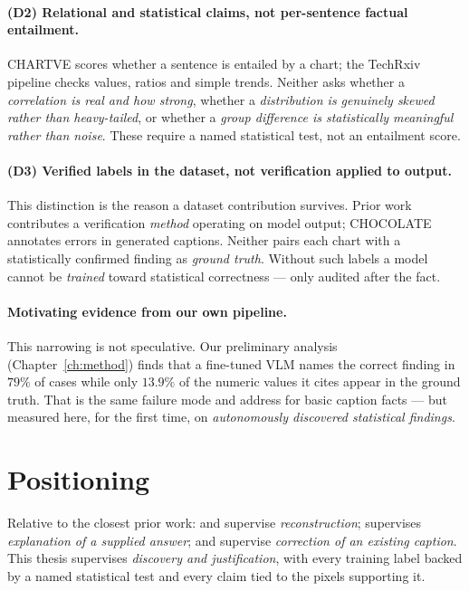 \paragraph{(D2) Relational and statistical claims, not per-sentence factual
entailment.} CHARTVE scores whether a sentence is entailed by a chart; the
TechRxiv pipeline checks values, ratios and simple trends. Neither asks whether a
\emph{correlation is real and how strong}, whether a \emph{distribution is
genuinely skewed rather than heavy-tailed}, or whether a \emph{group difference
is statistically meaningful rather than noise}. These require a named statistical
test, not an entailment score.

\paragraph{(D3) Verified labels in the dataset, not verification applied to
output.} This distinction is the reason a dataset contribution survives. Prior
work contributes a verification \emph{method} operating on model output;
CHOCOLATE annotates errors in generated captions. Neither pairs each chart with a
statistically confirmed finding as \emph{ground truth}. Without such labels a
model cannot be \emph{trained} toward statistical correctness --- only audited
after the fact.

\paragraph{Motivating evidence from our own pipeline.} This narrowing is not
speculative. Our preliminary analysis (Chapter~\ref{ch:method}) finds that a
fine-tuned VLM names the correct finding in $79\%$ of cases while only $13.9\%$
of the numeric values it cites appear in the ground truth. That is the same
failure mode \citet{chocolate} and \citet{techrxiv} address for basic caption
facts --- but measured here, for the first time, on \emph{autonomously discovered
statistical findings}.

\section{Positioning}

Relative to the closest prior work: \citet{chartgen} and \citet{chartcoder}
supervise \emph{reconstruction}; \citet{chartqax} supervises \emph{explanation of
a supplied answer}; \citet{chocolate} and \citet{techrxiv} supervise
\emph{correction of an existing caption}. This thesis supervises \emph{discovery
and justification}, with every training label backed by a named statistical test
and every claim tied to the pixels supporting it.
